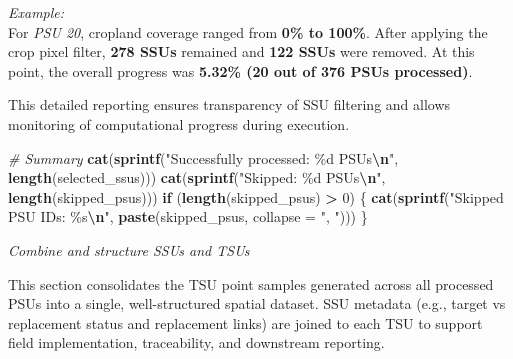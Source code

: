\documentclass[
  10pt,
  b5paper,
  oneside]{book}
\newenvironment{Shaded}{\begin{snugshade}}{\end{snugshade}}
\newcommand{\AttributeTok}[1]{\textcolor[rgb]{0.13,0.29,0.53}{#1}}
\newcommand{\CommentTok}[1]{\textcolor[rgb]{0.56,0.35,0.01}{\textit{#1}}}
\newcommand{\ControlFlowTok}[1]{\textcolor[rgb]{0.13,0.29,0.53}{\textbf{#1}}}
\newcommand{\DecValTok}[1]{\textcolor[rgb]{0.00,0.00,0.81}{#1}}
\newcommand{\FunctionTok}[1]{\textcolor[rgb]{0.13,0.29,0.53}{\textbf{#1}}}
\newcommand{\NormalTok}[1]{#1}
\newcommand{\SpecialCharTok}[1]{\textcolor[rgb]{0.81,0.36,0.00}{\textbf{#1}}}
\newcommand{\StringTok}[1]{\textcolor[rgb]{0.31,0.60,0.02}{#1}}
\begin{document}
\emph{Example:}\\
For \emph{PSU 20}, cropland coverage ranged from \textbf{0\% to 100\%}. After applying the crop pixel filter, \textbf{278 SSUs} remained and \textbf{122 SSUs} were removed. At this point, the overall progress was \textbf{5.32\% (20 out of 376 PSUs processed)}.

This detailed reporting ensures transparency of SSU filtering and allows monitoring of computational progress during execution.

\begin{Shaded}
\begin{Highlighting}[]
\CommentTok{\# Summary}
\FunctionTok{cat}\NormalTok{(}\FunctionTok{sprintf}\NormalTok{(}\StringTok{"Successfully processed: \%d PSUs}\SpecialCharTok{\textbackslash{}n}\StringTok{"}\NormalTok{, }\FunctionTok{length}\NormalTok{(selected\_ssus)))}
\FunctionTok{cat}\NormalTok{(}\FunctionTok{sprintf}\NormalTok{(}\StringTok{"Skipped: \%d PSUs}\SpecialCharTok{\textbackslash{}n}\StringTok{"}\NormalTok{, }\FunctionTok{length}\NormalTok{(skipped\_psus)))}
\ControlFlowTok{if}\NormalTok{ (}\FunctionTok{length}\NormalTok{(skipped\_psus) }\SpecialCharTok{\textgreater{}} \DecValTok{0}\NormalTok{) \{}
  \FunctionTok{cat}\NormalTok{(}\FunctionTok{sprintf}\NormalTok{(}\StringTok{"Skipped PSU IDs: \%s}\SpecialCharTok{\textbackslash{}n}\StringTok{"}\NormalTok{, }\FunctionTok{paste}\NormalTok{(skipped\_psus, }\AttributeTok{collapse =} \StringTok{", "}\NormalTok{)))}
\NormalTok{\}}
\end{Highlighting}
\end{Shaded}

\emph{Combine and structure SSUs and TSUs}

This section consolidates the TSU point samples generated across all processed PSUs into a single, well-structured spatial dataset. SSU metadata (e.g., target vs replacement status and replacement links) are joined to each TSU to support field implementation, traceability, and downstream reporting.
\end{document}
